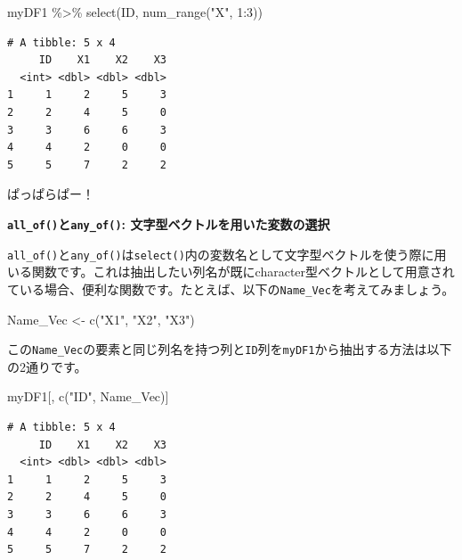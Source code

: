 \documentclass[
  a4paper,
  pandoc,
  ja=standard,
  jafont=haranoaji]{bxjsbook}
\newenvironment{Shaded}{\begin{snugshade}}{\end{snugshade}}
\newcommand{\DecValTok}[1]{\textcolor[rgb]{0.68,0.00,0.00}{#1}}
\newcommand{\FunctionTok}[1]{\textcolor[rgb]{0.28,0.35,0.67}{#1}}
\newcommand{\NormalTok}[1]{\textcolor[rgb]{0.00,0.48,0.65}{#1}}
\newcommand{\OtherTok}[1]{\textcolor[rgb]{0.00,0.48,0.65}{#1}}
\newcommand{\SpecialCharTok}[1]{\textcolor[rgb]{0.37,0.37,0.37}{#1}}
\newcommand{\StringTok}[1]{\textcolor[rgb]{0.13,0.47,0.30}{#1}}
\begin{document}
\begin{Shaded}
\begin{Highlighting}[numbers=left,,]
\NormalTok{myDF1 }\SpecialCharTok{\%\textgreater{}\%}
  \FunctionTok{select}\NormalTok{(ID, }\FunctionTok{num\_range}\NormalTok{(}\StringTok{"X"}\NormalTok{, }\DecValTok{1}\SpecialCharTok{:}\DecValTok{3}\NormalTok{))}
\end{Highlighting}
\end{Shaded}

\begin{verbatim}
# A tibble: 5 x 4
     ID    X1    X2    X3
  <int> <dbl> <dbl> <dbl>
1     1     2     5     3
2     2     4     5     0
3     3     6     6     3
4     4     2     0     0
5     5     7     2     2
\end{verbatim}

ぱっぱらぱー！

\textbf{\texttt{all\_of()}と\texttt{any\_of()}:
文字型ベクトルを用いた変数の選択}

\texttt{all\_of()}と\texttt{any\_of()}は\texttt{select()}内の変数名として文字型ベクトルを使う際に用いる関数です。これは抽出したい列名が既にcharacter型ベクトルとして用意されている場合、便利な関数です。たとえば、以下の\texttt{Name\_Vec}を考えてみましょう。

\begin{Shaded}
\begin{Highlighting}[numbers=left,,]
\NormalTok{Name\_Vec }\OtherTok{\textless{}{-}} \FunctionTok{c}\NormalTok{(}\StringTok{"X1"}\NormalTok{, }\StringTok{"X2"}\NormalTok{, }\StringTok{"X3"}\NormalTok{)}
\end{Highlighting}
\end{Shaded}

この\texttt{Name\_Vec}の要素と同じ列名を持つ列と\texttt{ID}列を\texttt{myDF1}から抽出する方法は以下の2通りです。

\begin{Shaded}
\begin{Highlighting}[numbers=left,,]
\NormalTok{myDF1[, }\FunctionTok{c}\NormalTok{(}\StringTok{"ID"}\NormalTok{, Name\_Vec)]}
\end{Highlighting}
\end{Shaded}

\begin{verbatim}
# A tibble: 5 x 4
     ID    X1    X2    X3
  <int> <dbl> <dbl> <dbl>
1     1     2     5     3
2     2     4     5     0
3     3     6     6     3
4     4     2     0     0
5     5     7     2     2
\end{verbatim}
\end{document}
